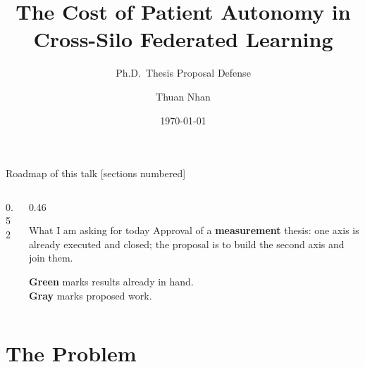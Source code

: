 \documentclass[aspectratio=169, 11pt]{beamer}
\title[The Cost of Patient Autonomy in Cross-Silo FL]%
      {The Cost of Patient Autonomy in\\Cross-Silo Federated Learning}
\subtitle{Ph.D.\ Thesis Proposal Defense}
\author{Thuan Nhan}
\institute{Ph.D.\ Program in Data Science}
\date{\today}
\begin{document}
\begin{frame}[plain]\titlepage\end{frame}

\begin{frame}{Roadmap of this talk}
[sections numbered]
\begin{columns}[T]
\begin{column}{0.52\textwidth}
{\small\tableofcontents}
\end{column}
\begin{column}{0.46\textwidth}
\begin{block}{What I am asking for today}
Approval of a \textbf{measurement} thesis: one axis is already executed and
closed; the proposal is to build the second axis and join them.
\end{block}
\vspace{0.4em}
{\footnotesize
\textcolor{mTeal}{\textbf{Green}} marks results already in hand.\\
\textcolor{mGray}{\textbf{Gray}} marks proposed work.}
\end{column}
\end{columns}
\end{frame}

\section{The Problem}
\end{document}
